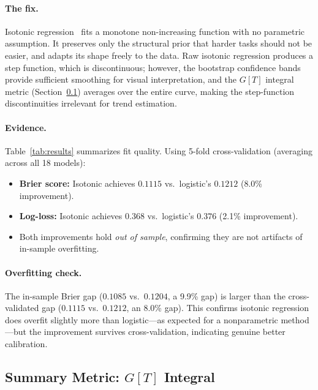 \documentclass[11pt,a4paper]{article}
\begin{document}
\paragraph{The fix.}
Isotonic regression~\citep{barlow1972,robertson1988} fits a monotone non-increasing function with no parametric assumption.
It preserves only the structural prior that harder tasks should not be easier, and adapts its shape freely to the data.
Raw isotonic regression produces a step function, which is discontinuous; however, the bootstrap confidence bands provide sufficient smoothing for visual interpretation, and the $G[T]$ integral metric (Section~\ref{sec:gt}) averages over the entire curve, making the step-function discontinuities irrelevant for trend estimation.

\paragraph{Evidence.}
Table~\ref{tab:results} summarizes fit quality.
Using 5-fold cross-validation (averaging across all 18 models):

\begin{itemize}
  \item \textbf{Brier score:} Isotonic achieves $0.1115$ vs.\ logistic's $0.1212$ (8.0\% improvement).
  \item \textbf{Log-loss:} Isotonic achieves $0.368$ vs.\ logistic's $0.376$ (2.1\% improvement).
  \item Both improvements hold \emph{out of sample}, confirming they are not artifacts of in-sample overfitting.
\end{itemize}

\paragraph{Overfitting check.}
The in-sample Brier gap ($0.1085$ vs.\ $0.1204$, a 9.9\% gap) is larger than the cross-validated gap ($0.1115$ vs.\ $0.1212$, an 8.0\% gap).
This confirms isotonic regression does overfit slightly more than logistic---as expected for a nonparametric method---but the improvement survives cross-validation, indicating genuine better calibration.


\subsection{Summary Metric: $G[T]$ Integral}
\label{sec:gt}
\end{document}
